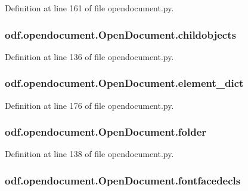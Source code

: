 Definition at line 161 of file opendocument.\+py.

\hypertarget{classodf_1_1opendocument_1_1OpenDocument_a4988e1e8d4d5b1ce896209f6efd3bb42}{
\subsubsection[{childobjects}]{\setlength{\rightskip}{0pt plus 5cm}odf.\+opendocument.\+Open\+Document.\+childobjects}}\label{classodf_1_1opendocument_1_1OpenDocument_a4988e1e8d4d5b1ce896209f6efd3bb42}


Definition at line 136 of file opendocument.\+py.

\hypertarget{classodf_1_1opendocument_1_1OpenDocument_a2a15b47d7741f4124760f7894fa6f41a}{
\subsubsection[{element\+\_\+dict}]{\setlength{\rightskip}{0pt plus 5cm}odf.\+opendocument.\+Open\+Document.\+element\+\_\+dict}}\label{classodf_1_1opendocument_1_1OpenDocument_a2a15b47d7741f4124760f7894fa6f41a}


Definition at line 176 of file opendocument.\+py.

\hypertarget{classodf_1_1opendocument_1_1OpenDocument_afcefb2363e0766829087469c5a2143d0}{
\subsubsection[{folder}]{\setlength{\rightskip}{0pt plus 5cm}odf.\+opendocument.\+Open\+Document.\+folder}}\label{classodf_1_1opendocument_1_1OpenDocument_afcefb2363e0766829087469c5a2143d0}


Definition at line 138 of file opendocument.\+py.

\hypertarget{classodf_1_1opendocument_1_1OpenDocument_a7ae9414a4c75f72ef776f2935a912b5a}{
\subsubsection[{fontfacedecls}]{\setlength{\rightskip}{0pt plus 5cm}odf.\+opendocument.\+Open\+Document.\+fontfacedecls}}\label{classodf_1_1opendocument_1_1OpenDocument_a7ae9414a4c75f72ef776f2935a912b5a}



